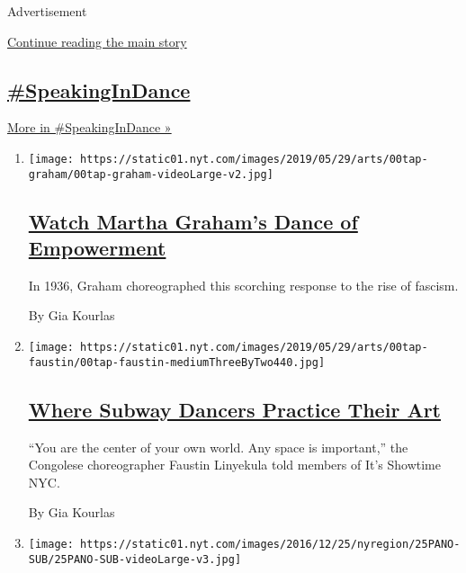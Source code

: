 Advertisement

\protect\hyperlink{after-mid1}{Continue reading the main story}

\hypertarget{speakingindance-1}{%
\subsection{\texorpdfstring{\href{/column/speakingindance}{\#SpeakingInDance}}{\#SpeakingInDance}}\label{speakingindance-1}}

\href{/column/speakingindance}{More in \#SpeakingInDance »}

\begin{enumerate}
\def\labelenumi{\arabic{enumi}.}
\item
  \texttt{[image: https://static01.nyt.com/images/2019/05/29/arts/00tap-graham/00tap-graham-videoLarge-v2.jpg]}

  \hypertarget{watch-martha-grahams-dance-of-empowerment}{%
  \subsection{\texorpdfstring{\href{/interactive/2019/05/30/arts/dance/speaking-in-dance-martha-graham.html}{Watch
  Martha Graham's Dance of
  Empowerment}}{Watch Martha Graham's Dance of Empowerment}}\label{watch-martha-grahams-dance-of-empowerment}}

  In 1936, Graham choreographed this scorching response to the rise of
  fascism.

  By Gia Kourlas
\item
  \texttt{[image: https://static01.nyt.com/images/2019/05/29/arts/00tap-faustin/00tap-faustin-mediumThreeByTwo440.jpg]}

  \hypertarget{where-subway-dancers-practice-their-art}{%
  \subsection{\texorpdfstring{\href{/interactive/2019/05/30/arts/dance/speaking-in-dance-showtime-faustin.html}{Where
  Subway Dancers Practice Their
  Art}}{Where Subway Dancers Practice Their Art}}\label{where-subway-dancers-practice-their-art}}

  ``You are the center of your own world. Any space is important,'' the
  Congolese choreographer Faustin Linyekula told members of It's
  Showtime NYC.

  By Gia Kourlas
\item
  \texttt{[image: https://static01.nyt.com/images/2016/12/25/nyregion/25PANO-SUB/25PANO-SUB-videoLarge-v3.jpg]}


\end{enumerate}

